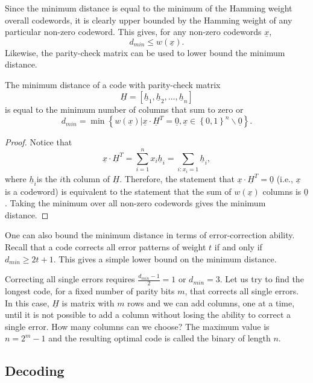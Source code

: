 Since the minimum distance is equal to the minimum of the Hamming weight overall codewords, it is clearly upper bounded by the Hamming weight of any particular non-zero codeword.
This gives, for any non-zero codewords $\underline{x}$,
\[ d_{min} \leq w(\underline{x}). \]
Likewise, the parity-check matrix can be used to lower bound the minimum distance.
\begin{proposition}
The minimum distance of a code with parity-check matrix
\[\underline{H}=\left[\underline{h}_{1},\underline{h}_{2},\ldots,\underline{h}_{n}\right] \]
is equal to the minimum number of columns that sum to zero or
\[ d_{min}=\min\left\{ w(\underline{x})|\underline{x}\cdot\underline{H}^{T}=\underline{0},\underline{x}\in\left\{ 0,1\right\} ^{n}\backslash\underline{0}\right\}. \]
\end{proposition}
\begin{proof}
Notice that
\[ \underline{x}\cdot\underline{H}^{T}=\sum_{i=1}^n x_{i}\underline{h}_{i}=\sum_{i:x_{i}=1}\underline{h}_{i}, \]
where $\underline{h}_{i}$is the $i$th column of $\underline{H}$.
Therefore, the statement that $\underline{x}\cdot\underline{H}^{T}=\underline{0}$ (i.e., $\underline{x}$ is a codeword) is equivalent to the statement that the sum of $w(\underline{x})$ columns is $\underline{0}$.
Taking the minimum over all non-zero codewords gives the minimum distance.
\end{proof}

One can also bound the minimum distance in terms of error-correction ability.
Recall that a code corrects all error patterns of weight $t$ if and only if $d_{min}\geq2t+1$.
This gives a simple lower bound on the minimum distance.

\begin{example}
Correcting all single errors requires $\frac{d_{min}-1}{2}=1$ or $d_{min}=3$.
Let us try to find the longest code, for a fixed number of parity bits $m$, that corrects all single errors.
In this case, $\underline{H}$ is  matrix with $m$ rows and we can add columns, one at a time, until it is not possible to add a column without losing the ability to correct a single error.
How many columns can we choose?
The maximum value is $n=2^m -1$ and the resulting optimal code is called the binary  of length $n$.
\end{example}

\subsection{Decoding}

